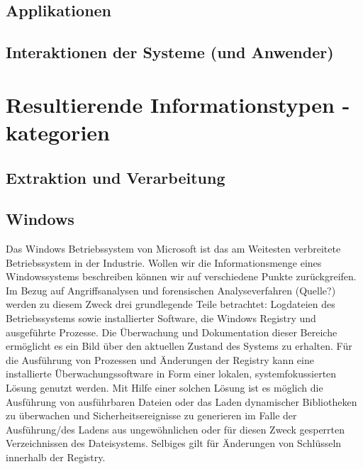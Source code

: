 \subsection{Applikationen}



\subsection{Interaktionen der Systeme (und Anwender)}





\section{Resultierende Informationstypen \/ -kategorien}
\subsection{Extraktion und Verarbeitung}
\subsection{Windows}
Das Windows Betriebssystem von Microsoft ist das am Weitesten verbreitete Betriebssystem in der Industrie. Wollen wir die Informationsmenge eines Windowssystems beschreiben können wir auf verschiedene Punkte zurückgreifen. Im Bezug auf Angriffsanalysen und forensischen Analyseverfahren (Quelle?) werden zu diesem Zweck drei grundlegende Teile betrachtet: Logdateien des Betriebssystems sowie installierter Software, die Windows Registry und ausgeführte Prozesse. Die Überwachung und Dokumentation dieser Bereiche ermöglicht es ein Bild über den aktuellen Zustand des Systems zu erhalten. 
Für die Ausführung von Prozessen und Änderungen der Registry kann eine installierte Überwachungssoftware in Form einer lokalen, systemfokussierten Lösung genutzt werden. Mit Hilfe einer solchen Lösung ist es möglich die Ausführung von ausführbaren Dateien oder das Laden dynamischer Bibliotheken zu überwachen und Sicherheitsereignisse zu generieren im Falle der Ausführung/des Ladens aus ungewöhnlichen oder für diesen Zweck gesperrten Verzeichnissen des Dateisystems. Selbiges gilt für Änderungen von Schlüsseln innerhalb der Registry. 

